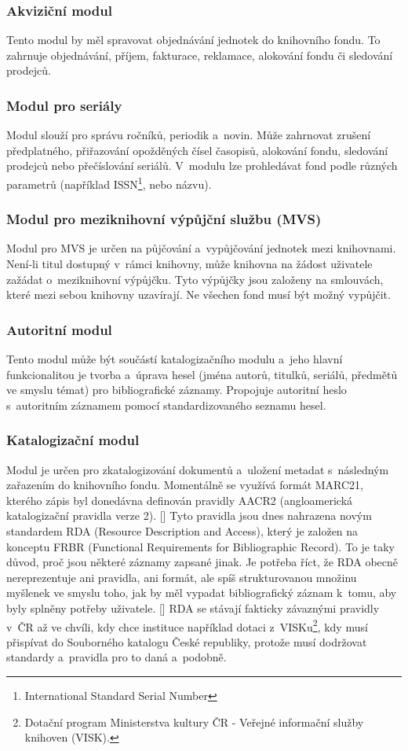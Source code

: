 \documentclass[
	11pt, oneside, printed, final, palatino, monochrome
	microtype,
	table,   %
	lof,     %
	lot     %
]{fithesis3}
\newcommand{\citepages}[2]{[\cite[#1]{#2}]}
\begin{document}
{\subsubsection{Akviziční modul}
Tento modul by měl spravovat objednávání jednotek do knihovního fondu. To zahrnuje objednávání, příjem, fakturace, reklamace, alokování fondu či sledování prodejců. 

\subsubsection{Modul pro seriály}
Modul slouží pro správu ročníků, periodik a~novin. Může zahrnovat zrušení předplatného, přiřazování opožděných čísel časopisů, alokování fondu, sledování prodejců nebo přečíslování seriálů. V~modulu lze prohledávat fond podle různých parametrů (například ISSN\footnote{International Standard Serial Number}, nebo názvu).

\subsubsection{Modul pro meziknihovní výpůjční službu (MVS)}
Modul pro MVS je určen na půjčování a~vypůjčování jednotek mezi knihovnami. Není-li titul dostupný v~rámci knihovny, může knihovna na žádost uživatele zažádat o~meziknihovní výpůjčku. Tyto výpůjčky jsou založeny na smlouvách, které mezi sebou knihovny uzavírají. Ne všechen fond musí být možný vypůjčit.

\subsubsection{Autoritní modul}
Tento modul může být součástí katalogizačního modulu a~jeho hlavní funkcionalitou je tvorba a~úprava hesel (jména autorů, titulků, seriálů, předmětů ve smyslu témat) pro bibliografické záznamy. Propojuje autoritní heslo s~autoritním záznamem pomocí standardizovaného seznamu hesel.

\subsubsection{Katalogizační modul}
Modul je určen pro zkatalogizování dokumentů a~uložení metadat s~následným zařazením do knihovního fondu. Momentálně se využívá formát MARC21, kterého zápis byl donedávna definován pravidly AACR2 (angloamerická katalogizační pravidla verze 2). \citepages{26-27}{dilhofova_kratochvilova_lidmila_2013} Tyto pravidla jsou dnes nahrazena novým standardem RDA (Resource Description and Access), který je založen na konceptu FRBR (Functional Requirements for Bibliographic Record). To je taky důvod, proč jsou některé záznamy zapsané jinak. Je potřeba říct, že RDA obecně nereprezentuje ani pravidla, ani formát, ale spíš strukturovanou množinu myšlenek ve smyslu toho, jak by měl vypadat bibliografický záznam k~tomu, aby byly splněny potřeby uživatele. \citepages{8}{bilal_2014}
RDA se stávají fakticky závaznými pravidly v~ČR až ve chvíli, kdy chce instituce například dotaci z~VISKu\footnote{Dotační program Ministerstva kultury ČR - Veřejné informační služby knihoven (VISK).}, kdy musí přispívat do Souborného katalogu České republiky, protože musí dodržovat standardy a~pravidla pro to daná a~podobně.

}
\end{document}
